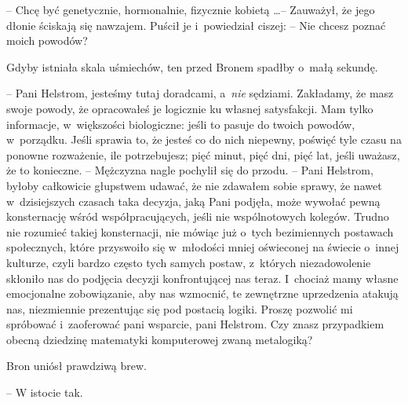 \documentclass[oneside,polish,11pt,rmheadings]{mwbk}
\begin{document}
-- Chcę być genetycznie, hormonalnie, fizycznie kobietą \ldots  --  Zauważył, że jego dłonie ściskają się nawzajem. Puścił je i~powiedział ciszej: -- Nie chcesz poznać moich powodów? 

Gdyby istniała skala uśmiechów, ten przed Bronem spadłby o~małą sekundę. 

-- Pani Helstrom, jesteśmy tutaj doradcami, a~\textit{nie }sędziami. Zakładamy, że masz swoje powody, że opracowałeś je logicznie ku własnej satysfakcji. Mam tylko informacje, w~większości biologiczne: jeśli to pasuje do twoich powodów, w~porządku. Jeśli sprawia to, że jesteś co do nich niepewny, poświęć tyle czasu na ponowne rozważenie, ile potrzebujesz; pięć minut, pięć dni, pięć lat, jeśli uważasz, że to konieczne. -- Mężczyzna nagle pochylił się do przodu. -- Pani Helstrom, byłoby całkowicie głupstwem udawać, że nie zdawałem sobie sprawy, że nawet w~dzisiejszych czasach taka decyzja, jaką Pani podjęła, może wywołać pewną konsternację wśród współpracujących, jeśli nie wspólnotowych kolegów. Trudno nie rozumieć takiej konsternacji, nie mówiąc już o~tych bezimiennych postawach społecznych, które przyswoiło się w~młodości mniej oświeconej na świecie o~innej kulturze, czyli bardzo często tych samych postaw, z~których niezadowolenie skłoniło nas do podjęcia decyzji konfrontującej nas teraz. I~chociaż mamy własne emocjonalne zobowiązanie, aby nas wzmocnić, te zewnętrzne uprzedzenia atakują nas, niezmiennie prezentując się pod postacią logiki. Proszę pozwolić mi spróbować i~zaoferować pani wsparcie, pani Helstrom. Czy znasz przypadkiem obecną dziedzinę matematyki komputerowej zwaną metalogiką?  

Bron uniósł prawdziwą brew. 

-- W istocie tak. 
\end{document}

